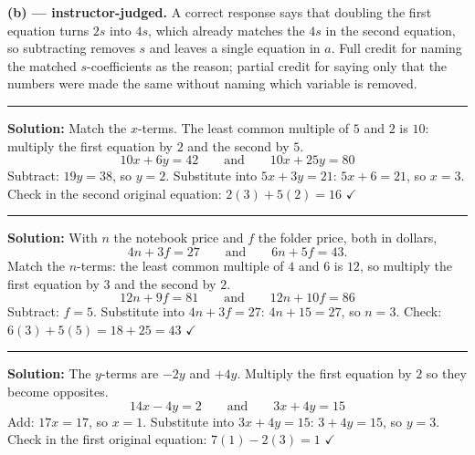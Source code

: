 \documentclass[12pt]{article}
\begin{document}
\textbf{(b) --- instructor-judged.} A correct response says that doubling the first equation turns $2s$ into $4s$, which already matches the $4s$ in the second equation, so subtracting removes $s$ and leaves a single equation in $a$. Full credit for naming the matched $s$-coefficients as the reason; partial credit for saying only that the numbers were made the same without naming which variable is removed.

\vspace{0.2cm}\noindent\rule{\linewidth}{0.2pt}


\textbf{Solution:} Match the $x$-terms. The least common multiple of $5$ and $2$ is $10$: multiply the first equation by $2$ and the second by $5$.
\[ 10x + 6y = 42 \qquad\text{and}\qquad 10x + 25y = 80 \]
Subtract: $19y = 38$, so $y = 2$. Substitute into $5x + 3y = 21$: $5x + 6 = 21$, so $x = 3$. Check in the second original equation: $2(3) + 5(2) = 16$ $\checkmark$ 

\vspace{0.2cm}\noindent\rule{\linewidth}{0.2pt}


\textbf{Solution:} With $n$ the notebook price and $f$ the folder price, both in dollars,
\[ 4n + 3f = 27 \qquad\text{and}\qquad 6n + 5f = 43. \]
Match the $n$-terms: the least common multiple of $4$ and $6$ is $12$, so multiply the first equation by $3$ and the second by $2$.
\[ 12n + 9f = 81 \qquad\text{and}\qquad 12n + 10f = 86 \]
Subtract: $f = 5$. Substitute into $4n + 3f = 27$: $4n + 15 = 27$, so $n = 3$. Check: $6(3) + 5(5) = 18 + 25 = 43$ $\checkmark$ 

\vspace{0.2cm}\noindent\rule{\linewidth}{0.2pt}


\textbf{Solution:} The $y$-terms are $-2y$ and $+4y$. Multiply the first equation by $2$ so they become opposites.
\[ 14x - 4y = 2 \qquad\text{and}\qquad 3x + 4y = 15 \]
Add: $17x = 17$, so $x = 1$. Substitute into $3x + 4y = 15$: $3 + 4y = 15$, so $y = 3$. Check in the first original equation: $7(1) - 2(3) = 1$ $\checkmark$ 
\end{document}
